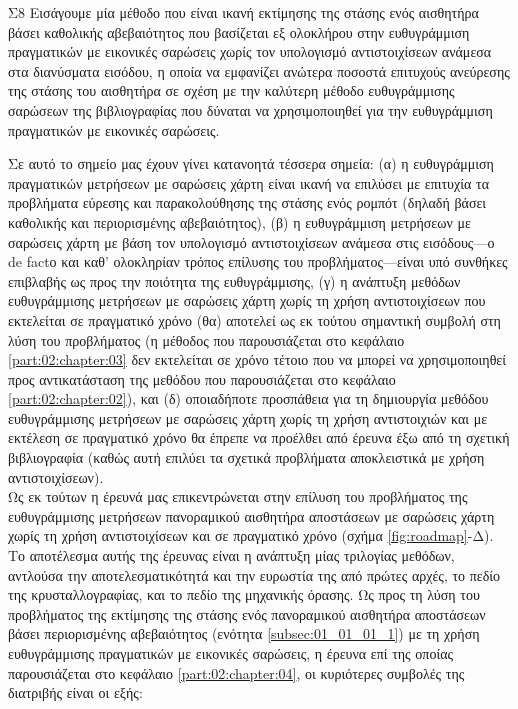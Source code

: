 \begin{bw_box}
\begin{customcontribution}{Σ8}
  \label{contribution:08}
  Εισάγουμε μία μέθοδο που είναι ικανή εκτίμησης της στάσης ενός αισθητήρα
  βάσει καθολικής αβεβαιότητος που βασίζεται εξ ολοκλήρου στην ευθυγράμμιση
  πραγματικών με εικονικές σαρώσεις χωρίς τον υπολογισμό αντιστοιχίσεων ανάμεσα
  στα διανύσματα εισόδου, η οποία να εμφανίζει ανώτερα ποσοστά επιτυχούς
  ανεύρεσης της στάσης του αισθητήρα σε σχέση με την καλύτερη μέθοδο
  ευθυγράμμισης σαρώσεων της βιβλιογραφίας που δύναται να χρησιμοποιηθεί για
  την ευθυγράμμιση πραγματικών με εικονικές σαρώσεις.
\end{customcontribution}
\end{bw_box}


Σε αυτό το σημείο μας έχουν γίνει κατανοητά τέσσερα σημεία: (α) η ευθυγράμμιση
πραγματικών μετρήσεων με σαρώσεις χάρτη είναι ικανή να επιλύσει με επιτυχία τα
προβλήματα εύρεσης και παρακολούθησης της στάσης ενός ρομπότ (δηλαδή βάσει
καθολικής και περιορισμένης αβεβαιότητος), (β) η ευθυγράμμιση μετρήσεων με
σαρώσεις χάρτη με βάση τον υπολογισμό αντιστοιχίσεων ανάμεσα στις εισόδους---ο
de factο και καθ' ολοκληρίαν τρόπος επίλυσης του προβλήματος---είναι υπό
συνθήκες επιβλαβής ως προς την ποιότητα της ευθυγράμμισης, (γ) η ανάπτυξη
μεθόδων ευθυγράμμισης μετρήσεων με σαρώσεις χάρτη χωρίς τη χρήση αντιστοιχίσεων
που εκτελείται σε πραγματικό χρόνο (θα) αποτελεί ως εκ τούτου σημαντική συμβολή
στη λύση του προβλήματος (η μέθοδος που παρουσιάζεται στο κεφάλαιο
\ref{part:02:chapter:03} δεν εκτελείται σε χρόνο τέτοιο που να μπορεί να
χρησιμοποιηθεί προς αντικατάσταση της μεθόδου που παρουσιάζεται στο κεφάλαιο
\ref{part:02:chapter:02}), και (δ) οποιαδήποτε προσπάθεια για τη δημιουργία
μεθόδου ευθυγράμμισης μετρήσεων με σαρώσεις χάρτη χωρίς τη χρήση αντιστοιχιών
και με εκτέλεση σε πραγματικό χρόνο θα έπρεπε να προέλθει από έρευνα έξω από τη
σχετική βιβλιογραφία (καθώς αυτή επιλύει τα σχετικά προβλήματα αποκλειστικά
με χρήση αντιστοιχίσεων).\\



Ως εκ τούτων η έρευνά μας επικεντρώνεται στην επίλυση του προβλήματος της
ευθυγράμμισης μετρήσεων πανοραμικού αισθητήρα αποστάσεων με σαρώσεις χάρτη
χωρίς τη χρήση αντιστοιχίσεων και σε πραγματικό χρόνο (σχήμα
\ref{fig:roadmap}-Δ). Το αποτέλεσμα αυτής της έρευνας είναι η ανάπτυξη μίας
τριλογίας μεθόδων, αντλούσα την αποτελεσματικότητά και την ευρωστία της από
πρώτες αρχές, το πεδίο της κρυσταλλογραφίας, και το πεδίο της μηχανικής όρασης.
Ως προς τη λύση του προβλήματος της εκτίμησης της στάσης ενός πανοραμικού
αισθητήρα αποστάσεων βάσει περιορισμένης αβεβαιότητος (ενότητα
\ref{subsec:01_01_01_1}) με τη χρήση ευθυγράμμισης πραγματικών με εικονικές
σαρώσεις, η έρευνα επί της οποίας παρουσιάζεται στο κεφάλαιο
\ref{part:02:chapter:04}, οι κυριότερες συμβολές της διατριβής είναι οι εξής:

